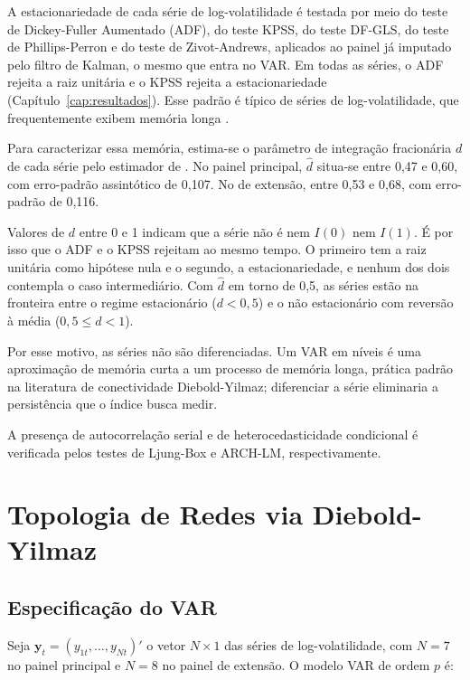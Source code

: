 \documentclass[12pt, a4paper, oneside, english, brazil]{abntex2}
\begin{document}
A estacionariedade de cada série de log-volatilidade é testada por meio do
teste de Dickey-Fuller Aumentado (ADF), do teste KPSS, do teste DF-GLS, do
teste de Phillips-Perron e do teste de Zivot-Andrews, aplicados ao painel já
imputado pelo filtro de Kalman, o mesmo que entra no VAR. Em todas as séries,
o ADF rejeita a raiz unitária e o KPSS rejeita a estacionariedade
(Capítulo~\ref{cap:resultados}). Esse padrão é típico de séries de
log-volatilidade, que frequentemente exibem memória longa
\parencite{andersen2001, andersen2003, diebold2001}.

Para caracterizar essa memória, estima-se o parâmetro de integração
fracionária $d$ de cada série pelo estimador de
\textcite{geweke1983}.
No painel principal, $\hat{d}$ situa-se entre 0,47 e 0,60, com erro-padrão assintótico de
0,107. No de extensão, entre 0,53 e 0,68, com erro-padrão de 0,116.

Valores de $d$ entre 0 e 1 indicam que a série não é nem $I(0)$ nem $I(1)$.
É por isso que o ADF e o KPSS rejeitam ao mesmo tempo. O primeiro tem a
raiz unitária como hipótese nula e o segundo, a estacionariedade, e nenhum dos
dois contempla o caso intermediário. Com $\hat{d}$ em torno de 0,5, as séries
estão na fronteira entre o regime estacionário ($d<0{,}5$) e o
não estacionário com reversão à média ($0{,}5 \le d < 1$).

Por esse motivo, as séries não são diferenciadas. Um VAR em níveis é uma
aproximação de memória curta a um processo de memória longa, prática padrão
na literatura de conectividade Diebold-Yilmaz; diferenciar a série eliminaria
a persistência que o índice busca medir.

A presença de autocorrelação serial e de heterocedasticidade condicional é
verificada pelos testes de Ljung-Box e ARCH-LM, respectivamente.

\section{Topologia de Redes via Diebold-Yilmaz}
\label{subsec:dy}

\subsection*{Especificação do VAR}

Seja $\mathbf{y}_t = (y_{1t}, \ldots, y_{Nt})'$ o vetor $N \times 1$ das séries de
log-volatilidade, com $N = 7$ no painel principal e $N=8$ no painel de extensão. O modelo VAR de ordem $p$ é:
\end{document}
